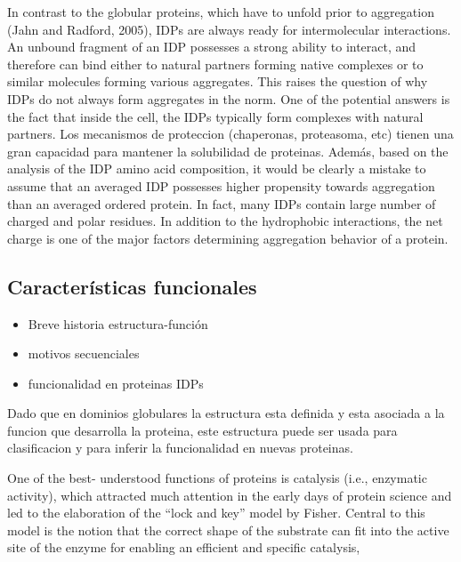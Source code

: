 In contrast to the globular proteins, which have to unfold prior to aggregation (Jahn and Radford, 2005), IDPs are always ready for intermolecular interactions. 
An unbound fragment of an IDP possesses a strong ability to interact, and therefore can bind either to natural partners forming native complexes or to similar molecules forming various aggregates. 
This raises the question of why IDPs do not always form aggregates in the norm. One of the potential answers is the fact that inside the cell, the IDPs typically form complexes with natural partners.
Los mecanismos de proteccion (chaperonas, proteasoma, etc) tienen una gran capacidad para mantener la solubilidad de proteinas.
Además, based on the analysis of the IDP amino acid composition, it would be clearly a mistake to assume that an averaged IDP possesses higher propensity towards aggregation than an averaged ordered
protein. In fact, many IDPs contain large number of charged and polar residues. In addition to the hydrophobic interactions, the net charge is one of the major factors determining aggregation behavior of a protein.













\subsection{Características funcionales}
\label{functionalLandscape}
\begin{itemize}
 \item Breve historia estructura-función
 \item motivos secuenciales
 \item funcionalidad en proteinas IDPs
\end{itemize}

Dado que en dominios globulares la estructura esta definida y esta asociada a la funcion que desarrolla la proteina, este estructura puede ser usada para clasificacion y para inferir la funcionalidad en nuevas proteinas.


One of the best-
understood functions of proteins is catalysis (i.e., enzymatic
activity), which attracted much attention in the early days of
protein science and led to the elaboration of the “lock and key”
model by Fisher. Central to this model is the notion that the
correct shape of the substrate can fit into the active site of the
enzyme for enabling an efficient and specific catalysis,






